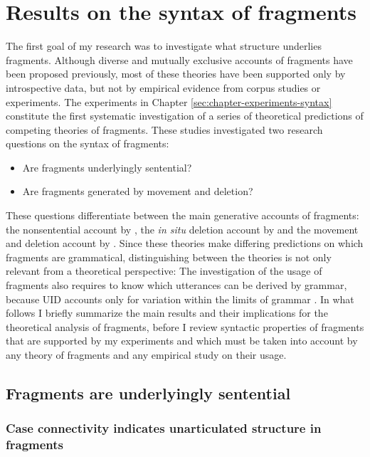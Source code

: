 \section{Results on the syntax of fragments}
The first goal of my research was to investigate what structure underlies fragments. Although diverse and mutually exclusive accounts of fragments have been proposed previously, most of these theories have been supported only by introspective data, but not by empirical evidence from corpus studies or experiments. The experiments in Chapter \ref{sec:chapter-experiments-syntax} constitute the first systematic investigation of a series of theoretical predictions of competing theories of fragments. These studies investigated two research questions on the syntax of fragments: 

\begin{itemize}\itemsep0em
 \item Are fragments underlyingly sentential?
 \item Are fragments generated by movement and deletion?
\end{itemize}

These questions differentiate between the main generative accounts of fragments: the nonsentential account by \citet{barton.progovac2005}, the \textit{in situ} deletion account by \citet{reich2007} and the movement and deletion account by \citet{merchant2004}. Since these theories make differing predictions on which fragments are grammatical, distinguishing between the theories is not only relevant from a theoretical perspective: The investigation of the usage of fragments also requires to know which utterances can be derived by grammar, because UID accounts only for variation within the limits of grammar \citep{jaeger2010}. In what follows I briefly summarize the main results and their implications for the theoretical analysis of fragments, before I review syntactic properties of fragments that are supported by my experiments and which must be taken into account by any theory of fragments and any empirical study on their usage.

\subsection{Fragments are underlyingly sentential}
\subsubsection{Case connectivity indicates unarticulated structure in fragments}

